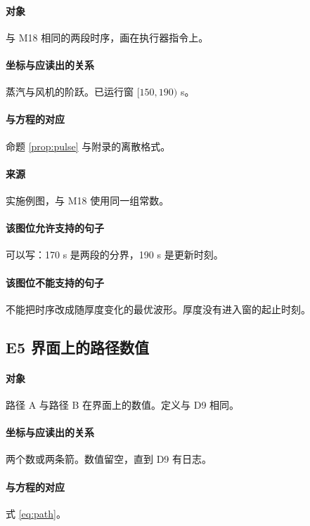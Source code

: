 \paragraph{对象}
与 M18 相同的两段时序，画在执行器指令上。

\paragraph{坐标与应读出的关系}
蒸汽与风机的阶跃。已运行窗 $[150,190)$ s。

\paragraph{与方程的对应}
命题 \ref{prop:pulse} 与附录的离散格式。

\paragraph{来源}
实施例图，与 M18 使用同一组常数。

\paragraph{该图位允许支持的句子}
可以写：170 s 是两段的分界，190 s 是更新时刻。

\paragraph{该图位不能支持的句子}
不能把时序改成随厚度变化的最优波形。厚度没有进入窗的起止时刻。

\subsection{E5 界面上的路径数值}
\paragraph{对象}
路径 A 与路径 B 在界面上的数值。定义与 D9 相同。

\paragraph{坐标与应读出的关系}
两个数或两条箭。数值留空，直到 D9 有日志。

\paragraph{与方程的对应}
式 \eqref{eq:path}。


